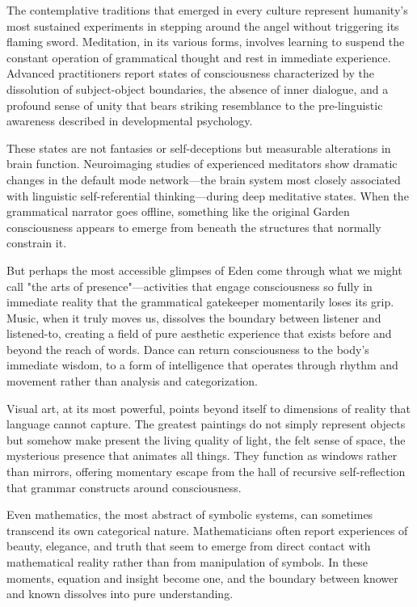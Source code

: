 The contemplative traditions that emerged in every culture represent humanity's most sustained experiments in stepping around the angel without triggering its flaming sword. Meditation, in its various forms, involves learning to suspend the constant operation of grammatical thought and rest in immediate experience. Advanced practitioners report states of consciousness characterized by the dissolution of subject-object boundaries, the absence of inner dialogue, and a profound sense of unity that bears striking resemblance to the pre-linguistic awareness described in developmental psychology.

These states are not fantasies or self-deceptions but measurable alterations in brain function. Neuroimaging studies of experienced meditators show dramatic changes in the default mode network—the brain system most closely associated with linguistic self-referential thinking—during deep meditative states. When the grammatical narrator goes offline, something like the original Garden consciousness appears to emerge from beneath the structures that normally constrain it.

But perhaps the most accessible glimpses of Eden come through what we might call "the arts of presence"—activities that engage consciousness so fully in immediate reality that the grammatical gatekeeper momentarily loses its grip. Music, when it truly moves us, dissolves the boundary between listener and listened-to, creating a field of pure aesthetic experience that exists before and beyond the reach of words. Dance can return consciousness to the body's immediate wisdom, to a form of intelligence that operates through rhythm and movement rather than analysis and categorization.

Visual art, at its most powerful, points beyond itself to dimensions of reality that language cannot capture. The greatest paintings do not simply represent objects but somehow make present the living quality of light, the felt sense of space, the mysterious presence that animates all things. They function as windows rather than mirrors, offering momentary escape from the hall of recursive self-reflection that grammar constructs around consciousness.

Even mathematics, the most abstract of symbolic systems, can sometimes transcend its own categorical nature. Mathematicians often report experiences of beauty, elegance, and truth that seem to emerge from direct contact with mathematical reality rather than from manipulation of symbols. In these moments, equation and insight become one, and the boundary between knower and known dissolves into pure understanding.


